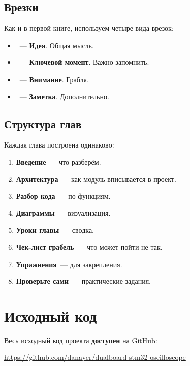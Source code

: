 \subsection{Врезки}

Как и в первой книге, используем четыре вида врезок:

\begin{itemize}
    \item \faLightbulb~--- \textbf{Идея}. Общая мысль.
    \item \faKey~--- \textbf{Ключевой момент}. Важно запомнить.
    \item \faExclamationTriangle~--- \textbf{Внимание}.
          Грабля.
    \item \faInfoCircle~--- \textbf{Заметка}. Дополнительно.
\end{itemize}

\subsection{Структура глав}

Каждая глава построена одинаково:

\begin{enumerate}
    \item \textbf{Введение}~--- что разберём.
    \item \textbf{Архитектура}~--- как модуль вписывается
          в проект.
    \item \textbf{Разбор кода}~--- по функциям.
    \item \textbf{Диаграммы}~--- визуализация.
    \item \textbf{Уроки главы}~--- сводка.
    \item \textbf{Чек-лист грабель}~--- что может пойти не так.
    \item \textbf{Упражнения}~--- для закрепления.
    \item \textbf{Проверьте сами}~--- практические задания.
\end{enumerate}

\section{Исходный код}
\label{sec:intro-source}

Весь исходный код проекта \textbf{доступен} на GitHub:

\begin{center}
\url{https://github.com/danayer/dualboard-stm32-oscilloscope}
\end{center}

